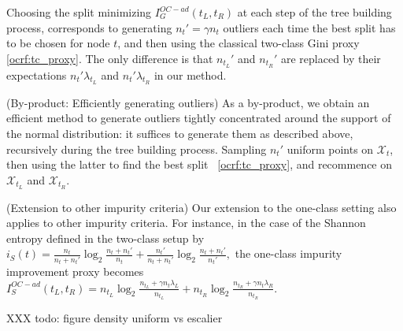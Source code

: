 Choosing the split minimizing $I_G^{OC-ad}(t_L, t_R)$ at each step of the tree building process, corresponds to generating $n_t' = \gamma n_t$ outliers each time the best split has to be chosen for node $t$, and then using the classical two-class Gini proxy \eqref{ocrf:tc_proxy}. The only difference is that $n_{t_L}'$ and $n_{t_R}'$ are replaced by their expectations $n_t'\lambda_{t_L}$ and $n_t'\lambda_{t_R}$ in our method.

\begin{remark}({\sc By-product: Efficiently generating outliers})
As a by-product, we obtain an efficient method to generate outliers tightly concentrated around the support of the normal distribution: it suffices to generate them as described above, recursively during the tree building process. Sampling $n_t'$ uniform points on $\mathcal{X}_t$, then using the latter to find the best split \wrt~\eqref{ocrf:tc_proxy}, and recommence on $\mathcal{X}_{t_L}$ and $\mathcal{X}_{t_R}$.
\end{remark}


\begin{remark}({\sc Extension to other impurity criteria})
Our extension to the one-class setting also applies to other impurity criteria. For instance, in the case of the Shannon entropy defined in the two-class setup by
$i_S(t) = \frac{n_t}{n_t + n_t'} \log_2 \frac{n_t + n_t'}{n_t} + \frac{n_t'}{n_t + n_t'} \log_2 \frac{n_t + n_t'}{n_t'},$
the one-class impurity improvement proxy becomes
$I_S^{OC-ad}(t_L, t_R) = n_{t_L} \log_2 \frac{n_{t_L} + \gamma n_t \lambda_L}{n_{t_L}} + n_{t_R} \log_2 \frac{n_{t_R} + \gamma n_t \lambda_R}{n_{t_R}}.$
\end{remark}

XXX todo: figure density uniform vs escalier

\newcommand{\pointSampled}[1]{
    \coordinate (A) at (#1);
    \draw[fill=black] (A) circle (0.03cm);
}


